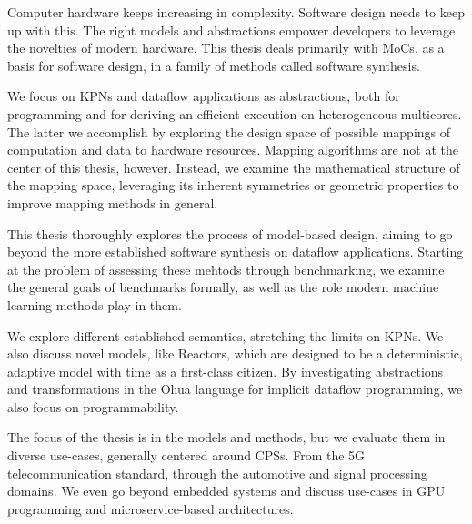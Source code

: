 Computer hardware keeps increasing in complexity.
Software design needs to keep up with this.
The right models and abstractions empower developers to leverage the novelties of modern hardware.
This thesis deals primarily with \aclp*{MoC}, as a basis for software design, in a family of methods called software synthesis.

We focus on \aclp*{KPN} and dataflow applications as abstractions, both for programming and for deriving an efficient execution on heterogeneous multicores.
The latter we accomplish by exploring the design space of possible mappings of computation and data to hardware resources.
Mapping algorithms are not at the center of this thesis, however.
Instead, we examine the mathematical structure of the mapping space, leveraging its inherent symmetries or geometric properties to improve mapping methods in general.

This thesis thoroughly explores the process of model-based design, aiming to go beyond the more established software synthesis on dataflow applications.
Starting at the problem of assessing these mehtods through benchmarking, we examine the general goals of benchmarks formally, as well as the role modern machine learning methods play in them.

We explore different established semantics, stretching the limits on \aclp*{KPN}.
We also discuss novel models, like Reactors, which are designed to be a deterministic, adaptive model with time as a first-class citizen.
By investigating abstractions and transformations in the Ohua language for implicit dataflow programming, we also focus on programmability.

The focus of the thesis is in the models and methods, but we evaluate them in diverse use-cases, generally centered around \aclp*{CPS}.
From the 5G telecommunication standard, through the automotive and signal processing domains.
We even go beyond embedded systems and discuss use-cases in \acs*{GPU} programming and microservice-based architectures.